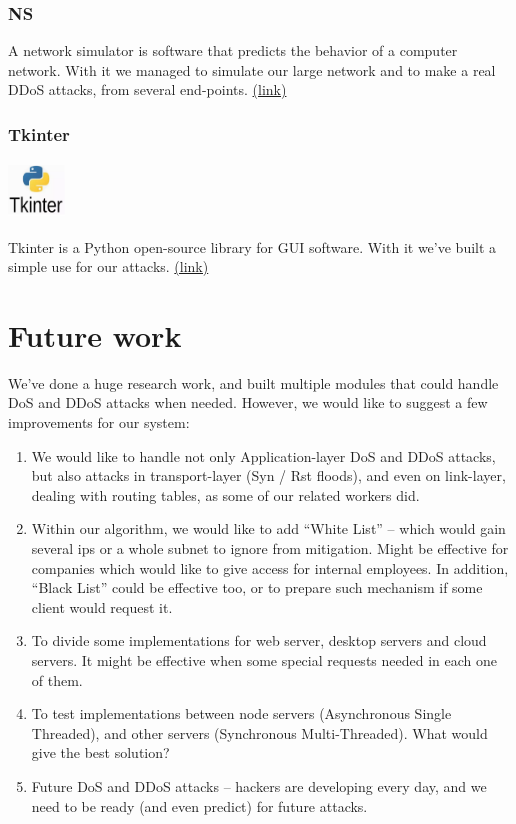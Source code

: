 \documentclass{report}
\begin{document}
\subsection {NS}
A network simulator is software that predicts the behavior of a computer network. With it we managed to simulate our large network and to make a real \gls{DDoS} attacks, from several end-points.
\href{https://www.isi.edu/nsnam/ns/}{(link)} 

\subsection {Tkinter}
     \begin{minipage}{\linewidth}
            \includegraphics[width=1.5cm,height=1.5cm,keepaspectratio]{tkinter}
        \end{minipage}
\hfill \break
Tkinter is a Python open-source library for \gls{GUI} software. With it we’ve built a simple use for our attacks.
\href{https://docs.python.org/3/library/tkinter.html}{(link)} 

\newpage
\chapter {Future work}
We’ve done a huge research work, and built multiple modules that could handle \gls{DoS} and \gls{DDoS} attacks when needed.
However, we would like to suggest a few improvements for our system:
\begin{enumerate}
\item We would like to handle not only Application-layer \gls{DoS} and \gls{DDoS} attacks, but also attacks in transport-layer (Syn / Rst floods), and even on link-layer, dealing with routing tables, as some of our related workers did.
\item Within our algorithm, we would like to add “White List” – which would gain several ips or a whole subnet to ignore from mitigation. Might be effective for companies which would like to give access for internal employees. In addition, “Black List” could be effective too, or to prepare such mechanism if some client would request it.
\item To divide some implementations for web server, desktop servers and cloud servers. It might be effective when some special requests needed in each one of them.
\item To test implementations between node servers (Asynchronous Single Threaded), and other servers (Synchronous Multi-Threaded). What would give the best solution?
\item Future DoS and DDoS attacks – hackers are developing every day, and we need to be ready (and even predict) for future attacks.
\end{enumerate}


\newpage
{}
\printglossary[type=\acronymtype,title=Acronyms]
\newpage
\bgroup
\hypersetup{linkcolor = black}
\listoffigures
\egroup
\newpage
{}
\printbibliography[title=References]
\end{document}
